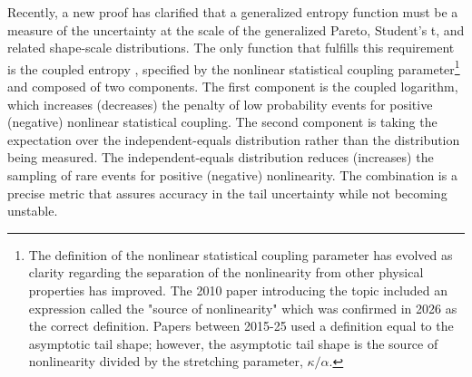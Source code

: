 \documentclass[twoside,11pt]{article}
\begin{document}
Recently, a new proof \citep{nelsonUniqueUniversalEntropy2026} has clarified that a generalized entropy function must be a measure of the uncertainty at the scale of the generalized Pareto, Student's t, and related shape-scale distributions. The only function that fulfills this requirement is the coupled entropy \citep{nelsonReducedPerplexitySimplified2020, nelsonAverageUncertaintySystems2017}, specified by the nonlinear statistical coupling parameter\footnote{The definition of the nonlinear statistical coupling parameter has evolved as clarity regarding the separation of the nonlinearity from other physical properties has improved. The 2010 paper introducing the topic included an expression called the "source of nonlinearity" which was  confirmed in 2026 as the correct definition. Papers between 2015-25 used a definition equal to the asymptotic tail shape; however, the asymptotic tail shape is the source of nonlinearity divided by the stretching parameter, $\kappa/\alpha$.} \citep{nelsonNonlinearStatisticalCoupling2010} and composed of two components. The first component is the coupled logarithm, which increases (decreases) the penalty of low probability events for positive (negative) nonlinear statistical coupling. The second component is taking the expectation over the independent-equals distribution rather than the distribution being measured. The independent-equals distribution reduces (increases) the sampling of rare events for positive (negative) nonlinearity. The combination is a precise metric that assures accuracy in the tail uncertainty while not becoming unstable.
\end{document}
